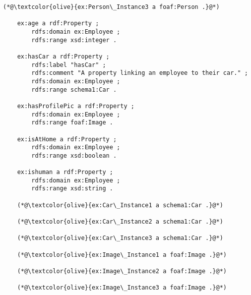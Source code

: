 \begin{lstlisting}[caption={Result Test Case 1.1}, label={lst:three-rdf-instances}]
    (*@\textcolor{olive}{ex:Person\_Instance3 a foaf:Person .}@*)
    
    ex:age a rdf:Property ;
        rdfs:domain ex:Employee ;
        rdfs:range xsd:integer .
    
    ex:hasCar a rdf:Property ;
        rdfs:label "hasCar" ;
        rdfs:comment "A property linking an employee to their car." ;
        rdfs:domain ex:Employee ;
        rdfs:range schema1:Car .
    
    ex:hasProfilePic a rdf:Property ;
        rdfs:domain ex:Employee ;
        rdfs:range foaf:Image .
    
    ex:isAtHome a rdf:Property ;
        rdfs:domain ex:Employee ;
        rdfs:range xsd:boolean .
    
    ex:ishuman a rdf:Property ;
        rdfs:domain ex:Employee ;
        rdfs:range xsd:string .
    
    (*@\textcolor{olive}{ex:Car\_Instance1 a schema1:Car .}@*)
    
    (*@\textcolor{olive}{ex:Car\_Instance2 a schema1:Car .}@*)
    
    (*@\textcolor{olive}{ex:Car\_Instance3 a schema1:Car .}@*)
    
    (*@\textcolor{olive}{ex:Image\_Instance1 a foaf:Image .}@*)
    
    (*@\textcolor{olive}{ex:Image\_Instance2 a foaf:Image .}@*)
    
    (*@\textcolor{olive}{ex:Image\_Instance3 a foaf:Image .}@*)
    \end{lstlisting}

